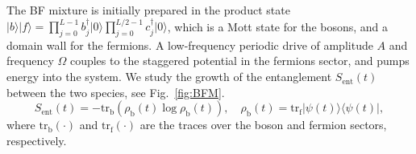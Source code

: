 \documentclass{SciPost}
\newcommand\0{\scalebox{-1}[1]{0}}
\begin{document}
The BF mixture is initially prepared in the product state $|b\rangle|f\rangle=\prod_{j=0}^{L-1}b^\dagger_j\vert 0\rangle\prod_{j=0}^{L/2-1}c^\dagger_j\vert 0\rangle$, which is a Mott state for the bosons, and a domain wall for the fermions. A low-frequency periodic drive of amplitude $A$ and frequency $\Omega$ couples to the staggered potential in the fermions sector, and pumps energy into the system. We study the growth of the entanglement $S_\mathrm{ent}(t)$ between the two species, see Fig.~\ref{fig:BFM}.
\begin{equation}
S_\mathrm{ent}(t) = -\mathrm{tr}_\mathrm{b}\left(\rho_\mathrm{b}(t)\log\rho_\mathrm{b}(t)\right),\quad \rho_\mathrm{b}(t) = \mathrm{tr}_\mathrm{f} |\psi(t)\rangle\langle\psi(t)|,
\end{equation}  
where $\mathrm{tr}_\mathrm{b}(\cdot)$ and $\mathrm{tr}_\mathrm{f}(\cdot)$ are the traces over the boson and fermion sectors, respectively.
\end{document}
